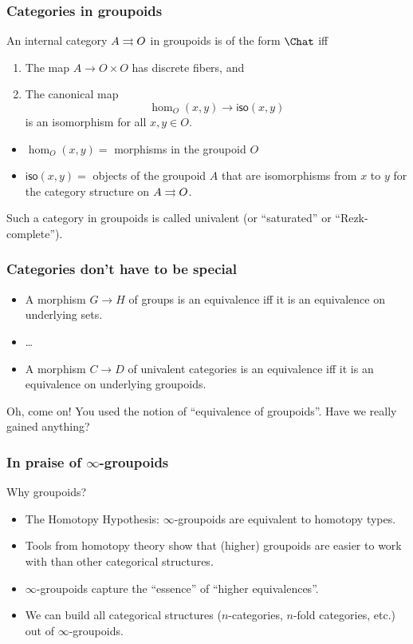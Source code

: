 \documentclass{beamer}
\begin{document}
\begin{frame}
  \frametitle{Categories in groupoids}
  \begin{theorem}
    An internal category $A\rightrightarrows O$ in groupoids is of the form $\Chat$ iff
    \begin{enumerate}
    \item The map $A\to O\times O$ has discrete fibers, and
    \item The canonical map
    \[ \hom_O(x,y) \to \mathsf{iso}(x,y) \]
    is an isomorphism for all $x,y\in O$.
    \end{enumerate}
  \end{theorem}
  \begin{itemize}
  \item $\hom_O(x,y)=$ morphisms in the groupoid $O$
  \item $\mathsf{iso}(x,y)=$ objects of the groupoid $A$ that are isomorphisms from $x$ to $y$ for the category structure on $A\rightrightarrows O$.
  \end{itemize}
  \pause
  Such a category in groupoids is called \alert{univalent} (or ``saturated'' or ``Rezk-complete'').
\end{frame}

\begin{frame}
  \frametitle{Categories don't have to be special}
  \begin{itemize}
  \item A morphism $G\to H$ of groups is an equivalence iff it is an equivalence on underlying sets.
  \item \dots
  \item A morphism $C\to D$ of \alert<1>{univalent categories} is an equivalence iff it is an equivalence on underlying groupoids.
  \end{itemize}
  \pause
  \begin{block}{Oh, come on!}
    You used the notion of ``equivalence of groupoids''.  Have we really gained anything?
  \end{block}
\end{frame}

\begin{frame}
  \frametitle{In praise of $\infty$-groupoids}
  \begin{block}{Why groupoids?}
    \begin{itemize}
    \item The Homotopy Hypothesis: $\infty$-groupoids are equivalent to homotopy types.
    \item Tools from homotopy theory show that (higher) groupoids are easier to work with than other categorical structures.
    \item $\infty$-groupoids capture the ``essence'' of ``higher equivalences''.
    \item We can build {all} categorical structures ($n$-categories, $n$-fold categories, etc.) out of $\infty$-groupoids.
    \end{itemize}
  \end{block}
\end{frame}
\end{document}
